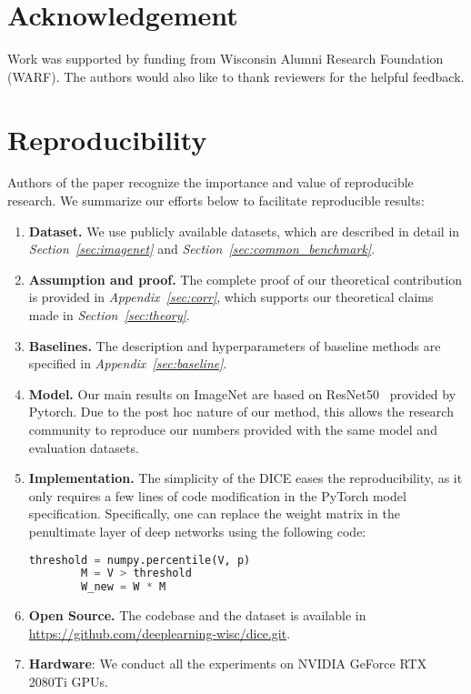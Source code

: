 \documentclass[runningheads]{llncs}
\begin{document}
\section*{Acknowledgement}

Work was supported by funding from Wisconsin Alumni Research Foundation (WARF). The authors would also like to thank reviewers for the helpful  feedback.


\clearpage







\appendix
\clearpage
\newpage

\onecolumn


\section{Reproducibility}
    \label{sec:reproduce}
 Authors of the paper recognize the importance and value of reproducible research. 
 We summarize our efforts below to facilitate reproducible results: 
 \begin{enumerate}
     \item \textbf{Dataset.} We use {publicly available} datasets, which are described in detail in   \emph{Section~\ref{sec:imagenet}} and \emph{Section~\ref{sec:common_benchmark}}. 
\item \textbf{Assumption and proof.} The complete proof of our theoretical contribution is provided in \emph{Appendix~\ref{sec:corr}}, which supports our theoretical claims made in \emph{Section~\ref{sec:theory}}.
     \item \textbf{Baselines.} The description and hyperparameters of baseline methods are specified in \emph{Appendix~\ref{sec:baseline}}.
     \item \textbf{Model.} Our main results on ImageNet are based on ResNet50~\cite{he2016identity} provided by Pytorch. Due to the post hoc nature of our method, this allows the research community to reproduce our numbers provided with the same model and evaluation datasets. 
     \item  \textbf{Implementation.} The simplicity of the DICE eases the reproducibility, as it only requires a few lines of code modification in the PyTorch model specification. Specifically, one can replace the weight matrix in the penultimate layer of deep networks using the following code:
\begin{lstlisting}[language=Python]
        threshold = numpy.percentile(V, p)
        M = V > threshold
        W_new = W * M
\end{lstlisting}
    \item  \textbf{Open Source.}  The codebase and the dataset is available in  \url{https://github.com/deeplearning-wisc/dice.git}.
    \item \textbf{Hardware}: We conduct all the experiments on NVIDIA GeForce RTX 2080Ti GPUs.
 \end{enumerate}
\end{document}
